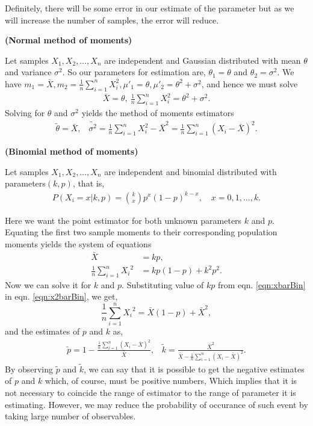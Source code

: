 Definitely, there will be some error in our estimate of the parameter but as we will increase the number of samples, the error will reduce.
\begin{exmp}\textbf{(Normal method of moments)}
\par Let samples $X_1,X_2,\dots,X_n$ are independent and Gaussian distributed with mean $\theta$ and variance $\sigma^2$. So our parameters for estimation are, $\theta_1=\theta$ and $\theta_2=\sigma^2$. We have $m_1 = \bar{X}, m_2 = \frac{1}{n}\sum_{i=1}^n{X^2_i}, \mu'_1=\theta, \mu'_2 = \theta^2 + \sigma^2 $, and hence we must solve 
\begin{align}
\bar{X}=\theta,~\frac{1}{n}\sum_{i=1}^n{X^2_i} = \theta^2 + \sigma^2.
\end{align} 
Solving for $\theta$ and $\sigma^2$ yields the method of moments estimators
\begin{align}
\tilde{\theta} = \bar{X},\,\,\,\,\,\tilde{\sigma^2}=\frac{1}{n}\sum_{i=1}^n{X^2_i} - \bar{X}^2=\frac{1}{n}\sum_{i=1}^n{(X_i - \bar{X})}^2.
\end{align} 
\end{exmp}
\begin{exmp}\textbf{(Binomial method of moments)}
\par Let samples $X_1,X_2,\dots,X_n$ are independent and binomial distributed with parameters$(k,p)$, that is,
\begin{align}
P(X_i=x|k,p) = {{k}\choose{x}}p^x(1-p)^{k-x},\,\,\,\,\,\,x=0,1,...,k.
\end{align} 
 
Here we want the point estimator for both unknown parameters $k$ and $p$.
Equating the first two sample moments to their corresponding population moments yields the system of equations
\begin{align}\label{eqn:xbarBin}
\bar{X} &= kp,\\\label{eqn:x2barBin}
\frac{1}{n}\sum_{i=1}^n{X_i}^2 &= kp(1-p) + k^2p^2.
\end{align} 
Now we can solve it  for $k$ and $p$. Substituting value of $kp$ from eqn. \eqref{eqn:xbarBin} in eqn. \eqref{eqn:x2barBin}, we get,
\begin{equation}
\frac{1}{n}\sum_{i=1}^n{X_i}^2 = \bar{X}(1-p) + \bar{X}^2,
\end{equation}
and the estimates of $p$ and $k$ as,
\begin{align}
\tilde{p}=1-\frac{\frac{1}{n}\sum_{i=1}^n{(X_i - \bar{X})}^2}{\bar{X}} ,     \,\,\,\,\,\tilde{k} = \frac{\bar{X}^2}{\bar{X}-\frac{1}{n}\sum_{i=1}^n{(X_i - \bar{X})}^2}.
\end{align} 
By observing $\tilde{p}$ and $\tilde{k}$, we can say that it is possible to get the negative estimates of $p$ and $k$ which, of course, must be positive numbers, Which implies that it is not necessary to coincide the range of estimator to the range of parameter it is estimating. However, we may reduce the probability of occurance of such event by taking large number of observables.   
\end{exmp}
